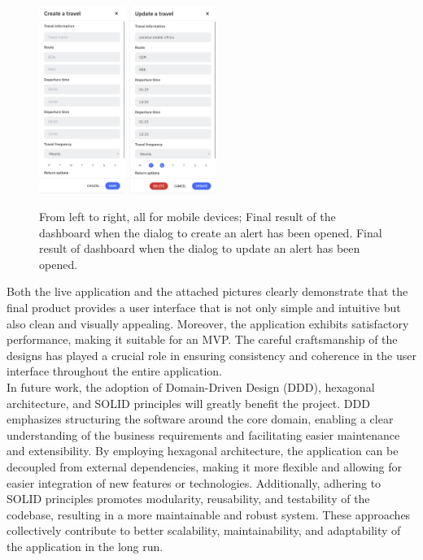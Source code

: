 \documentclass[./memory.tex]{subfiles}
\begin{document}
\begin{figure}[H]
	\centering
	\includegraphics[width=0.25\textwidth]{./assets/results/mobile-create.png}
	\hspace*{12pt}
	\includegraphics[width=0.25\textwidth]{./assets/results/mobile-update.png}
	\caption{From left to right, all for mobile devices; Final result of the
		dashboard when the dialog to create an alert has been opened. Final result
		of dashboard when the dialog to update an alert has been opened.}
\end{figure}
Both the live application and the attached pictures clearly demonstrate that the
final product provides a user interface that is not only simple and intuitive
but also clean and visually appealing. Moreover, the application exhibits
satisfactory performance, making it suitable for an MVP. The careful
craftsmanship of the designs has played a crucial role in ensuring consistency
and coherence in the user interface throughout the entire application.
\\[8pt]
In future work, the adoption of Domain-Driven Design (DDD), hexagonal
architecture, and SOLID principles will greatly benefit the project. DDD
emphasizes structuring the software around the core domain, enabling a clear
understanding of the business requirements and facilitating easier maintenance
and extensibility. By employing hexagonal architecture, the application can be
decoupled from external dependencies, making it more flexible and allowing for
easier integration of new features or technologies. Additionally, adhering to
SOLID principles promotes modularity, reusability, and testability of the
codebase, resulting in a more maintainable and robust system. These approaches
collectively contribute to better scalability, maintainability, and adaptability
of the application in the long run.
\end{document}

